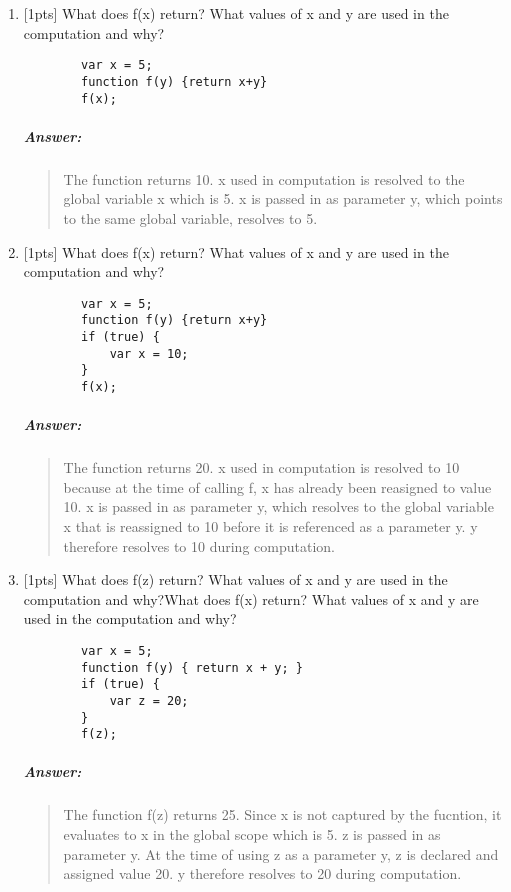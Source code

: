 \documentclass{article}
\begin{document}
\begin{enumerate}[label=\textbf{\arabic*}.]
	\item {[1pts]} What does f(x) return? What values of x and y are used in the computation and why?
		\begin{lstlisting}
		var x = 5;
		function f(y) {return x+y}
		f(x);
		\end{lstlisting}

		\subparagraph{Answer: }
			\begin{quote}
			The function returns 10. x used in computation is resolved to the global
			variable x which is 5. x is passed in as parameter y, which points to the
			same global variable, resolves to 5.
			\end{quote}


	\item {[1pts]} What does f(x) return? What values of x and y are used
		in the computation and why?
		\begin{lstlisting}
		var x = 5;
		function f(y) {return x+y}
		if (true) {
			var x = 10;
		}
		f(x);
		\end{lstlisting}

		\subparagraph{Answer: }
			\begin{quote}
			The function returns 20. x used in computation is resolved to 10 because
			at the time of calling f, x has already been reasigned to value 10. x is
			passed in as parameter y, which resolves to the global variable x that is
			reassigned to 10 before it is referenced as a parameter y. y therefore
			resolves to 10 during computation.
			\end{quote}


	\item {[1pts]} What does f(z) return? What values of x and y are used in
		the computation and why?What does f(x) return? What values of x and y are used
		in the computation and why?

		\begin{lstlisting}
		var x = 5;
		function f(y) { return x + y; }
		if (true) {
			var z = 20;
		}
		f(z);
		\end{lstlisting}

		\subparagraph{Answer: }
			\begin{quote}
			The function f(z) returns 25. Since x is not captured by the
			fucntion, it evaluates to x in the global scope which is 5. z is passed in
			as parameter y. At the time of using z as a parameter y, z is declared
			and assigned value 20. y therefore resolves to 20 during computation.
			\end{quote}



\end{enumerate}
\end{document}
